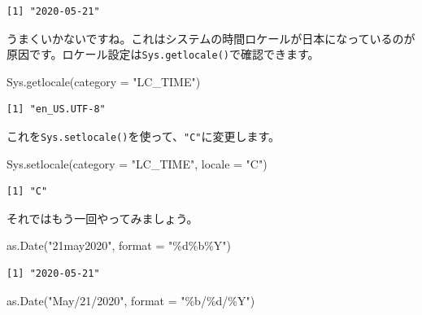 \documentclass[
  a4paper,
  pandoc,
  ja=standard,
  jafont=haranoaji]{bxjsbook}
\newenvironment{Shaded}{\begin{snugshade}}{\end{snugshade}}
\newcommand{\AttributeTok}[1]{\textcolor[rgb]{0.00,0.48,0.65}{#1}}
\newcommand{\FunctionTok}[1]{\textcolor[rgb]{0.28,0.35,0.67}{#1}}
\newcommand{\NormalTok}[1]{\textcolor[rgb]{0.00,0.48,0.65}{#1}}
\newcommand{\StringTok}[1]{\textcolor[rgb]{0.13,0.47,0.30}{#1}}
\begin{document}
\begin{verbatim}
[1] "2020-05-21"
\end{verbatim}

うまくいかないですね。これはシステムの時間ロケールが日本になっているのが原因です。ロケール設定は\texttt{Sys.getlocale()}で確認できます。

\begin{Shaded}
\begin{Highlighting}[numbers=left,,]
\FunctionTok{Sys.getlocale}\NormalTok{(}\AttributeTok{category =} \StringTok{"LC\_TIME"}\NormalTok{)}
\end{Highlighting}
\end{Shaded}

\begin{verbatim}
[1] "en_US.UTF-8"
\end{verbatim}

これを\texttt{Sys.setlocale()}を使って、\texttt{"C"}に変更します。

\begin{Shaded}
\begin{Highlighting}[numbers=left,,]
\FunctionTok{Sys.setlocale}\NormalTok{(}\AttributeTok{category =} \StringTok{"LC\_TIME"}\NormalTok{, }\AttributeTok{locale =} \StringTok{"C"}\NormalTok{)}
\end{Highlighting}
\end{Shaded}

\begin{verbatim}
[1] "C"
\end{verbatim}

それではもう一回やってみましょう。

\begin{Shaded}
\begin{Highlighting}[numbers=left,,]
\FunctionTok{as.Date}\NormalTok{(}\StringTok{"21may2020"}\NormalTok{,   }\AttributeTok{format =} \StringTok{"\%d\%b\%Y"}\NormalTok{)}
\end{Highlighting}
\end{Shaded}

\begin{verbatim}
[1] "2020-05-21"
\end{verbatim}

\begin{Shaded}
\begin{Highlighting}[numbers=left,,]
\FunctionTok{as.Date}\NormalTok{(}\StringTok{"May/21/2020"}\NormalTok{, }\AttributeTok{format =} \StringTok{"\%b/\%d/\%Y"}\NormalTok{)}
\end{Highlighting}
\end{Shaded}
\end{document}
